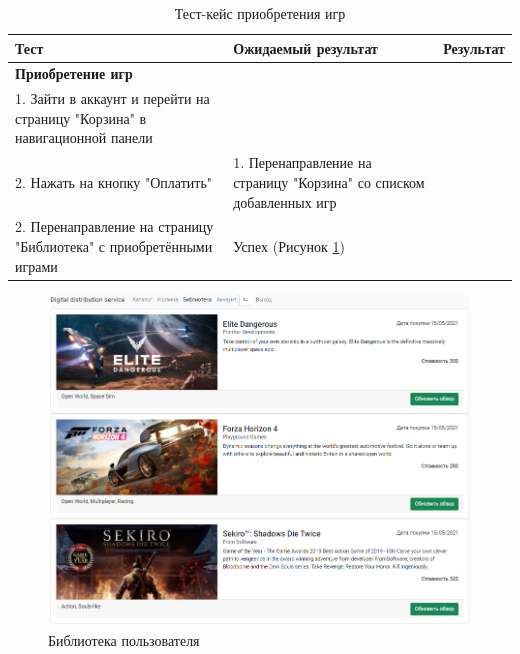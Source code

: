 \begin{table}[!htb]
	\caption{Тест-кейс приобретения игр}
	\label{table:testing:func:test5}
	\centering
	  \begin{tabular}{| >{\raggedright}m{} 
					  | >{\raggedright}m{} 
					  | >{\raggedright\arraybackslash}m{}|}
	  \hline Тест & Ожидаемый результат  & Результат \\
	  \hline \textbf{Приобретение игр} \\ 1. Зайти в аккаунт и перейти на страницу "Корзина" в навигационной панели \\ 2. Нажать на кнопку "Оплатить" & 1. Перенаправление на страницу "Корзина" со списком добавленных игр \\ 2. Перенаправление на страницу "Библиотека" с приобретёнными играми & Успех (Рисунок \ref*{sec:testing:func:library})\\
	  \hline
	  \end{tabular}
\end{table}
\clearpage
\begin{figure}[!ht]
	\centering
	  \includegraphics[scale=0.5]{attachments/library.png}  
	  \caption{ Библиотека пользователя }
	  \label{sec:testing:func:library}
\end{figure}

